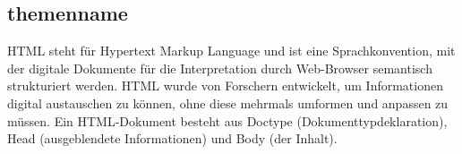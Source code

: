 \subsection{themenname}

HTML steht für Hypertext Markup Language und ist eine Sprachkonvention, mit der digitale Dokumente für die Interpretation durch Web-Browser semantisch strukturiert werden. HTML wurde von Forschern entwickelt, um Informationen digital austauschen zu können, ohne diese mehrmals umformen und anpassen zu müssen. Ein HTML-Dokument besteht aus Doctype (Dokumenttypdeklaration), Head (ausgeblendete Informationen) und Body (der Inhalt). 
